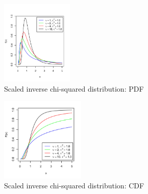 \begin{table}[H]
    \begin{minipage}{0.49\linewidth}
        \begin{figure}[H]
            \centering
            \includegraphics[width=\linewidth, height=4cm, keepaspectratio]{Pictures/distributions/Scaled_inverse_chi_squared_pdf.jpg}
            \caption{Scaled inverse chi-squared distribution: PDF}
        \end{figure}
    \end{minipage}
    \hfill
    \begin{minipage}{0.49\linewidth}
        \begin{figure}[H]
            \centering
            \includegraphics[width=\linewidth, height=4cm, keepaspectratio]{Pictures/distributions/Scaled_inverse_chi_squared_cdf.jpg}
            \caption{Scaled inverse chi-squared distribution: CDF}
        \end{figure}
    \end{minipage}
\end{table}

